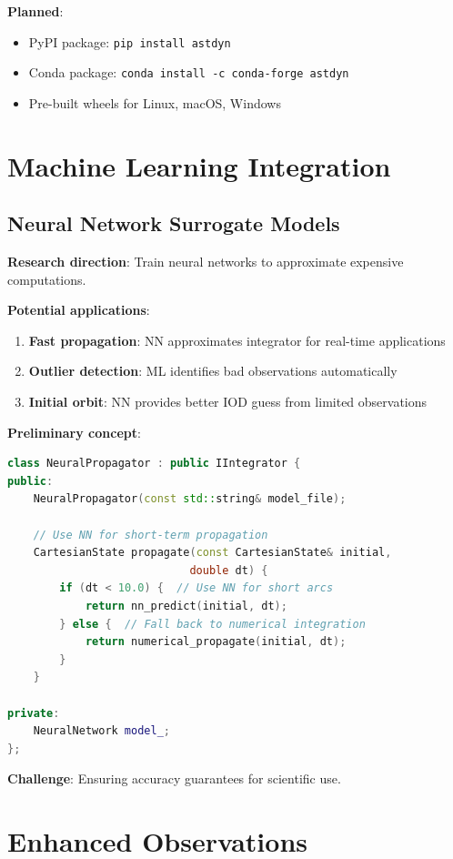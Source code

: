 \textbf{Planned}:
\begin{itemize}
    \item PyPI package: \texttt{pip install astdyn}
    \item Conda package: \texttt{conda install -c conda-forge astdyn}
    \item Pre-built wheels for Linux, macOS, Windows
\end{itemize}

\section{Machine Learning Integration}

\subsection{Neural Network Surrogate Models}

\textbf{Research direction}: Train neural networks to approximate expensive computations.

\textbf{Potential applications}:
\begin{enumerate}
    \item \textbf{Fast propagation}: NN approximates integrator for real-time applications
    \item \textbf{Outlier detection}: ML identifies bad observations automatically
    \item \textbf{Initial orbit}: NN provides better IOD guess from limited observations
\end{enumerate}

\textbf{Preliminary concept}:
\begin{lstlisting}[language=C++]
class NeuralPropagator : public IIntegrator {
public:
    NeuralPropagator(const std::string& model_file);
    
    // Use NN for short-term propagation
    CartesianState propagate(const CartesianState& initial, 
                            double dt) {
        if (dt < 10.0) {  // Use NN for short arcs
            return nn_predict(initial, dt);
        } else {  // Fall back to numerical integration
            return numerical_propagate(initial, dt);
        }
    }
    
private:
    NeuralNetwork model_;
};
\end{lstlisting}

\textbf{Challenge}: Ensuring accuracy guarantees for scientific use.

\section{Enhanced Observations}

